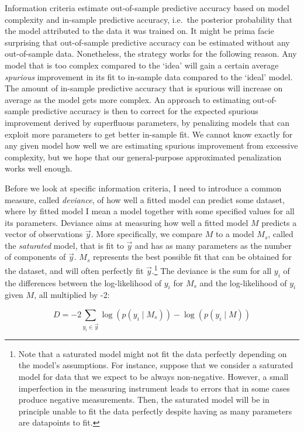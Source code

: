 \documentclass[a4paper,12pt,twoside]{article}
\begin{document}
Information criteria estimate out-of-sample predictive accuracy based on model complexity and in-sample predictive accuracy, i.e.\ the posterior probability that the model attributed to the data it was trained on. It might be prima facie surprising that out-of-sample predictive accuracy can be estimated without any out-of-sample data. Nonetheless, the strategy works for the following reason. Any model that is too complex compared to the `idea' will gain a certain average \textit{spurious} improvement in its fit to in-sample data compared to the `ideal' model. The amount of in-sample predictive accuracy that is spurious will increase on average as the model gets more complex. An approach to estimating out-of-sample predictive accuracy is then to correct for the expected spurious improvement derived by superfluous parameters, by penalizing models that can exploit more parameters to get better in-sample fit. We cannot know exactly for any given model how well we are estimating spurious improvement from excessive complexity, but we hope that our general-purpose approximated penalization works well enough.

Before we look at specific information criteria, I need to introduce a common measure, called \textit{deviance}, of how well a fitted model can predict some dataset, where by fitted model I mean a model together with some specified values for all its parameters. Deviance aims at measuring how well a fitted model $M$ predicts a vector of observations $\vec{y}$. More specifically, we compare $M$ to a model $M_s$, called the \textit{saturated} model, that is fit to $\vec{y}$ and has as many parameters as the number of components of $\vec{y}$. $M_s$ represents the best possible fit that can be obtained for the dataset, and will often perfectly fit $\vec{y}$.\footnote{Note that a saturated model might not fit the data perfectly depending on the model's assumptions. For instance, suppose that we consider a saturated model for data that we expect to be always non-negative. However, a small imperfection in the measuring instrument leads to errors that in some cases produce negative measurements. Then, the saturated model will be in principle unable to fit the data perfectly despite having as many parameters are datapoints to fit.} The deviance is the sum for all $y_i$ of the differences between the log-likelihood of $y_i$ for $M_s$ and the log-likelihood of $y_i$ given $M$, all multiplied by -2:

\begin{equation}
D = -2 \sum_{ y_i \in \vec{y}} \log(p( y_i \mid M_s )) - \log(p( y_i \mid M))
\end{equation}
\end{document}
